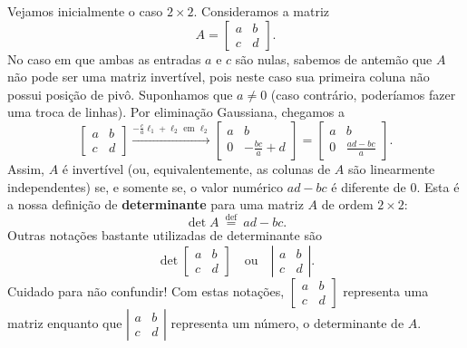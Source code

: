 Vejamos inicialmente o caso $2 \times 2$. Consideramos a matriz
\begin{equation}
A = \begin{bmatrix}
a & b \\
c & d
\end{bmatrix}.
\end{equation} No caso em que ambas as entradas $a$ e $c$ são nulas, sabemos de antemão que $A$ não pode ser uma matriz invertível, pois neste caso sua primeira coluna não possui posição de pivô. Suponhamos que $a \neq 0$ (caso contrário, poderíamos fazer uma troca de linhas). Por eliminação Gaussiana, chegamos a
\begin{equation}
\begin{bmatrix}
a & b \\
c & d
\end{bmatrix} \xrightarrow{- \frac{c}{a} \ell_1 + \ell_2 \text{ em } \ell_2}
\begin{bmatrix}
a & b \\
0 & - \frac{bc}{a} + d
\end{bmatrix} =
\begin{bmatrix}
a & b \\
0 & \frac{ad - bc}{a}
\end{bmatrix}.
\end{equation} Assim, $A$ é invertível (ou, equivalentemente, as colunas de $A$ são linearmente independentes) se, e somente se, o valor numérico $ad - bc$ é diferente de $0$. Esta é a nossa definição de \textbf{determinante} para uma matriz $A$ de ordem $2 \times 2$:
\begin{equation}
\det A \ \stackrel{\text{def}}{=} \ ad - bc.
\end{equation} Outras notações bastante utilizadas de determinante são
\begin{equation}
\det \begin{bmatrix}
a & b \\
c & d
\end{bmatrix} \quad \text{ou} \quad
\left| \begin{matrix}
a & b \\
c & d
\end{matrix} \right|.
\end{equation} Cuidado para não confundir! Com estas notações, $\begin{bmatrix}
a & b \\
c & d
\end{bmatrix}$ representa uma matriz enquanto que $\left| \begin{matrix}
a & b \\
c & d
\end{matrix} \right|$ representa um número, o determinante de $A$.

